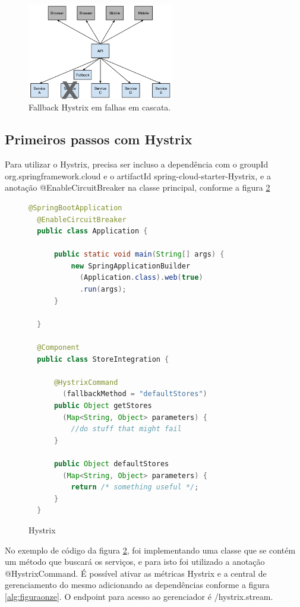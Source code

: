 \documentclass[journal]{IEEEtran}
\begin{document}
\begin{figure}[h]
\centering
\includegraphics[height=4.2cm]{figura7}
\caption{Fallback Hystrix em falhas em cascata.}
\label{fig:figura7}
\end{figure}

\subsection{Primeiros passos com Hystrix}

Para utilizar o Hystrix, precisa ser incluso a dependência com o groupId org.springframework.cloud e o artifactId spring-cloud-starter-Hystrix, e a anotação @EnableCircuitBreaker na classe principal, conforme a figura \ref{alg:figuradez}

\begin{figure}[h]
\centering

\begin{lstlisting}[language=Java]
  @SpringBootApplication
  @EnableCircuitBreaker
  public class Application {

      public static void main(String[] args) {
          new SpringApplicationBuilder
            (Application.class).web(true)
            .run(args);
      }

  }

  @Component
  public class StoreIntegration {

      @HystrixCommand
        (fallbackMethod = "defaultStores")
      public Object getStores
        (Map<String, Object> parameters) {
          //do stuff that might fail
      }

      public Object defaultStores
        (Map<String, Object> parameters) {
          return /* something useful */;
      }
  }
\end{lstlisting}

\caption{Hystrix}
\label{alg:figuradez}
\end{figure}

No exemplo de código da figura \ref{alg:figuradez}, foi implementando uma classe que se contém um método que buscará os serviços, e para isto foi utilizado a anotação @HystrixCommand. É possível ativar as métricas Hystrix e a central de gerenciamento do mesmo adicionando as dependências conforme a figura \ref{alg:figuraonze}. O endpoint para acesso ao gerenciador é /hystrix.stream.
\end{document}
